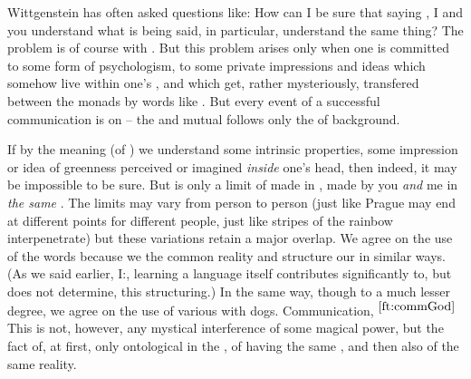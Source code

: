 \pa Wittgenstein has often asked questions like: How can I be sure that
saying , I and you understand what is being said, in particular,
understand the same thing? The problem is of course with . But
this problem arises only when one is committed to some form of psychologism, to
some private impressions and ideas which somehow live within one's
, and which get, rather mysteriously, transfered between the
monads by words like .  But every event of a successful communication
is  on  -- the  and mutual
 follows only the  of  background.

If by the meaning (of ) we understand some intrinsic properties, some
impression or idea of greenness perceived or imagined {\em inside} one's head,
then indeed, it may be impossible to be sure.  But  is only a
limit of  made in , made by you {\em and} me in {\em
the same} . The limits may vary from person to person (just like Prague
may end at different points for different people, just like stripes of the
rainbow interpenetrate) but these variations retain a major
overlap. We agree on the use of the words because we  the common
reality and structure our  in similar ways. (As we said earlier,
I:, learning a language itself contributes
significantly to, but does not determine, this structuring.) In the same way,
though to a much lesser degree, we agree on the use of various  with
dogs.  Communication, $^{\ref{ft:commGod}}$ This  is not, however, any mystical
interference of some magical power, but the fact of, at first, only ontological
 in the , of having the same , and then also
of  the same reality.

